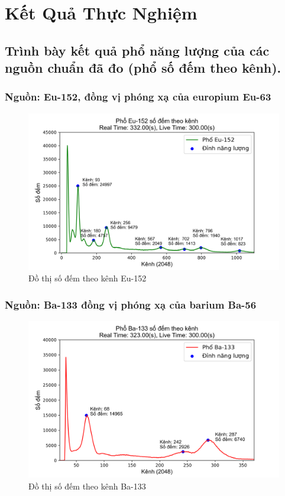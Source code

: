 \documentclass[12pt]{article}
\begin{document}
\newpage \section{Kết Quả Thực Nghiệm}

\subsection{Trình bày kết quả phổ năng lượng của các nguồn chuẩn đã đo (phổ số đếm theo kênh).}
\subsubsection{Nguồn: Eu-152, đồng vị phóng xạ của europium Eu-63}

\begin{figure}[h]
	\includegraphics[width=\textwidth]{Eu-152-Plot_cn}
	\caption{Đồ thị số đếm theo kênh Eu-152}
\end{figure}

\newpage
\subsubsection{Nguồn: Ba-133 đồng vị phóng xạ của barium Ba-56}

\begin{figure}[!th]
	\includegraphics[width=\textwidth]{Ba-133-Plot_cn}
	\caption{Đồ thị số đếm theo kênh Ba-133}
\end{figure}
\end{document}

